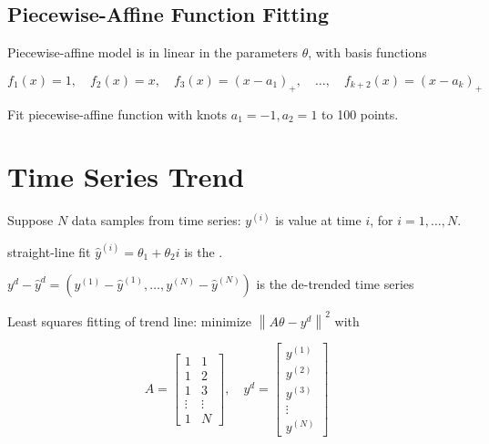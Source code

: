 \subsection{Piecewise-Affine Function Fitting}

Piecewise-affine model is in linear in the parameters $ \theta $, with basis functions

\begin{equation}
f_{1}(x)=1, \quad f_{2}(x)=x, \quad f_{3}(x)=\left(x-a_{1}\right)_{+}, \quad \ldots, \quad f_{k+2}(x)=\left(x-a_{k}\right)_{+}
\end{equation}

\begin{example}
    Fit piecewise-affine function with knots $ a_{1}=-1, a_{2}=1 $ to 100 points.
\end{example}

\section{Time Series Trend}

\begin{definition}
    Suppose $ N $ data samples from time series: $ y^{(i)} $ is value at time $ i $, for $ i=1, \ldots, N $.

    straight-line fit $ \hat{y}^{(i)}=\theta_{1}+\theta_{2} i $ is the .
\end{definition}

\begin{definition}
    $ y^{{d}}-\hat{y}^{{d}}=\left(y^{(1)}-\hat{y}^{(1)}, \ldots, y^{(N)}-\hat{y}^{(N)}\right) $ is the de-trended time series
\end{definition}

\begin{problem}
    Least squares fitting of trend line: minimize $ \left\|A \theta-y^{{d}}\right\|^{2} $ with

\begin{equation} A=\left[\begin{array}{cc}1 & 1 \\ 1 & 2 \\ 1 & 3 \\ \vdots & \vdots \\ 1 & N\end{array}\right], \quad y^{{d}}=\left[\begin{array}{c}y^{(1)} \\ y^{(2)} \\ y^{(3)} \\ \vdots \\ y^{(N)}\end{array}\right] \end{equation}
\end{problem}


